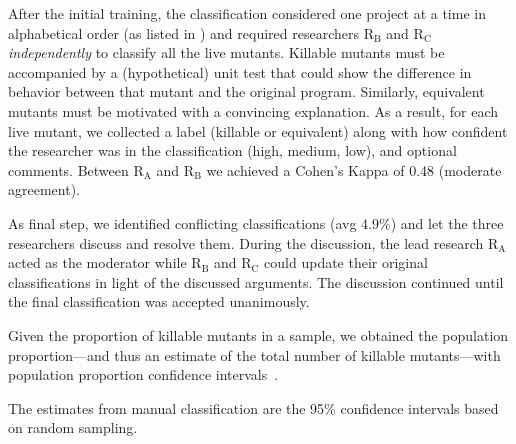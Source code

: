 \documentclass[sigconf,review,anonymous]{acmart}
\newcommand{\rA}{\textsc{R$_\text{A}$}\xspace}
\newcommand{\rB}{\textsc{R$_\text{B}$}\xspace}
\newcommand{\rC}{\textsc{R$_\text{C}$}\xspace}
\begin{document}
After the initial training, the classification considered one project at a time in alphabetical order
(as listed in ) and required researchers \rB and \rC \emph{independently}
to classify all the live mutants. %
%
Killable mutants must be accompanied by a (hypothetical) unit test that could show the difference
in behavior between that mutant and the original program. Similarly, equivalent mutants must be
motivated with a convincing explanation. %
%
As a result, for each live mutant, we collected %
a label (killable or equivalent) along with how confident the researcher was in the classification (high, medium, low), %
and optional comments.
Between \rA and \rB we achieved a Cohen's Kappa of 0.48 (moderate agreement).

As final step, we identified conflicting classifications (avg $4.9\%$) %
and let the three researchers discuss and resolve them. 
%
During the discussion, the lead research \rA acted as the moderator while 
\rB and \rC could update their original classifications in light of the discussed
arguments. The discussion continued until the final classification was accepted unanimously. 
%

Given the proportion of killable mutants in a sample, we obtained the population proportion---and thus an estimate of the total number of killable
mutants---with population proportion confidence intervals~\cite{ott2015introduction}.

The estimates from manual classification are the 95\% confidence intervals based on random sampling.
\end{document}
